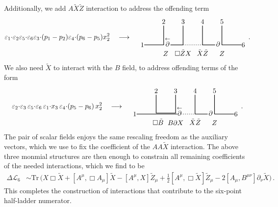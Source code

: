 \documentclass[11pt,a4paper]{article}
\newcommand{\ee}[2]{\varepsilon_{#1} {\cdot} \varepsilon_{#2}}
\newcommand{\z}{x}
\newcommand{\ez}[2]{\varepsilon_{#1} {\cdot} \z_{#2}}
\newcommand{\scalarF}{\textcolor{black}{X}}
\begin{document}
Additionally, we add $A \tilde{X} \tilde{Z}$ interaction to address the offending term
\begin{align}
 \ee{1}{2} \ee{5}{6} \varepsilon_3{\cdot}(p_1-p_2)\varepsilon_4{\cdot}(p_6-p_5) \z_2^2  
  \ \ \ \longrightarrow \ \ \ 
\begin{tikzpicture}[baseline={(0, +0.3cm)}]
\draw[thick] (-2.5,0) -- (-1.5,0) -- (-1.5,1) ;
\draw[thick] (1.5,1) -- (1.5,0) -- (2.5,0);
\draw[thick] (0.5,1) -- (0.5,0)  ;
\draw[thick,dotted] (-0.5,0) -- (0.5,0) ;
\draw[thick] (1.15,0) -- (0.5,0);
\draw[thick] (-0.5,1) -- (-0.5,0);
\draw[thick] (-0.5,0) -- (-1.15,0);
\node at (-2.6,0) {$1$};
\node at (-1.5,1.2) {$2$};
\node at (-.5,1.2) {$3$};
\node at (.5,1.2) {$4$};
\node at (1.5,1.2) {$5$};
\node at (2.6,0) {$6$};
\node at (-1.4,-0.45) {$Z$};
\node at (-0.5,-0.4) {$\square \tilde{Z} \scalarF$};
\node at (0.5,-0.4) {$\tilde{\scalarF}\tilde{Z}$};
\node at (1.5,-0.45) {$Z$};
\node at (-1.3,0.15) {$\overset{\leftarrow}{\partial}$};
\node at (1.3,0.05) {$\partial$};
\end{tikzpicture} \, .
\end{align}
We also need $\tilde{X}$ to interact with the $B$ field, to address offending terms of the form
\begin{equation}
\ee{2}{3} \, \ee{5}{6} \, \ez{1}{3} \, \varepsilon_4 {\cdot} (p_5 - p_6) \, \z_2^2
 \ \ \ \longrightarrow \ \ \ 
\begin{tikzpicture}[baseline={(0, +0.3cm)}]
\draw[thick] (-2.5,0) -- (-0.42,0) ;
\draw[thick] (1.5,1) -- (1.5,0) -- (2.5,0);
\draw[thick] (0.5,1) -- (0.5,0) -- (1.15,0);
\draw[thick,dotted] (-0.2,0) -- (0.5,0);
\draw[thick] (-0.5,1) -- (-0.5,0.05)--(-1.5,0.05)--(-1.5,1);
\node at (-2.6,0) {$1$};
\node at (-1.5,1.2) {$2$};
\node at (-.5,1.2) {$3$};
\node at (.5,1.2) {$4$};
\node at (1.5,1.2) {$5$};
\node at (2.6,0) {$6$};
\node at (-1.4,-0.4) {$\Box \tilde{B}$};
\node at (-0.5,-0.45) {$B \partial X$};
\node at (0.5,-0.4) {$\tilde{X} \tilde{Z}$};
\node at (1.5,-0.45) {$Z$};
\node at (-0.3,0.15) {$\overset{\leftarrow}{\partial}$};
\node at (1.3,0.05) {$\partial$};
\end{tikzpicture}
\, .
\end{equation}
The pair of scalar fields enjoys the same rescaling freedom as the auxiliary vectors, which we use to fix the coefficient of the $AA \tilde{X}$ interaction. The above three monmial structures are then enough to constrain all remaining coefficients of the needed interactions, which we find to be
 \begin{align}
\Delta  \mathcal{L}_6 &\sim \text{Tr} \, \Big( X \Box \tilde{X} + [ A^\mu,  \Box  A_\mu ] \tilde{X} -  [ A^\mu ,  X ] \tilde{Z}_\mu + \frac{1}{2}  [ A^\mu , \Box \tilde{X} ] \tilde{Z}_\mu - 2 [ A_\mu , B^{\mu \nu} ] \partial_\nu \tilde{X} \Big) \, .
\end{align}
This completes the construction of interactions that contribute to the six-point half-ladder numerator.
\end{document}

